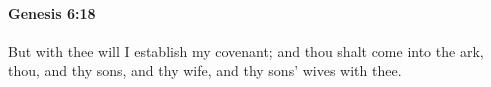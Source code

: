 
		\paragraph{Genesis 6:18} %
			\label{GENESIS-6-18}

			But with thee will I establish my covenant; and thou shalt come into the ark, thou, and thy sons, and thy wife, and thy sons' wives with thee.



